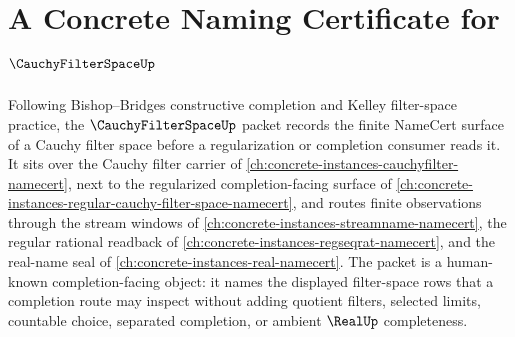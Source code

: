 \chapter{A Concrete Naming Certificate for $\CauchyFilterSpaceUp$}
\label{ch:concrete-instances-cauchy-filter-space-namecert}

Following Bishop--Bridges constructive completion and Kelley filter-space practice, the $\CauchyFilterSpaceUp$ packet records the finite NameCert surface of a Cauchy filter space before a regularization or completion consumer reads it. It sits over the Cauchy filter carrier of \autoref{ch:concrete-instances-cauchyfilter-namecert}, next to the regularized completion-facing surface of \autoref{ch:concrete-instances-regular-cauchy-filter-space-namecert}, and routes finite observations through the stream windows of \autoref{ch:concrete-instances-streamname-namecert}, the regular rational readback of \autoref{ch:concrete-instances-regseqrat-namecert}, and the real-name seal of \autoref{ch:concrete-instances-real-namecert}. The packet is a human-known completion-facing object: it names the displayed filter-space rows that a completion route may inspect without adding quotient filters, selected limits, countable choice, separated completion, or ambient $\RealUp$ completeness.

